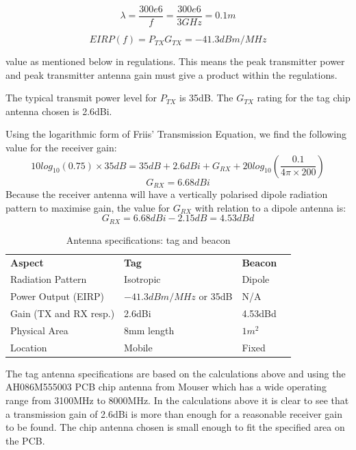 $$\lambda = \frac{300e6}{f} = \frac{300e6}{3GHz} = 0.1m$$

$$EIRP(f) = P_{TX}G_{TX} = -41.3dBm/MHz$$
\begin{center}
value as mentioned below in regulations. This means the peak transmitter power and peak transmitter antenna gain must give a product within the regulations.
\end{center}

The typical transmit power level for $P_{TX}$ is 35dB.\cite{DW-data} The $G_{TX}$ rating for the tag chip antenna chosen is 2.6dBi.

Using the logarithmic form of Friis' Transmission Equation, we find the following value for the receiver gain: 
$$10log_{10}(0.75) \times 35dB = 35dB + 2.6dBi + G_{RX} + 20log_{10}(\frac{0.1}{4 \pi \times 200})$$
$$G_{RX} = 6.68dBi$$
Because the receiver antenna will have a vertically polarised dipole radiation pattern to maximise  gain, the value for $G_{RX}$ with relation to a dipole antenna is:\cite{Book-Antenna} 
$$G_{RX} = 6.68dBi - 2.15dB = 4.53dBd$$

\begin{table}[H]
\centering
\caption{Antenna specifications: tag and beacon}
\label{antenna-specs}
\begin{tabular}{l l l l}
\textbf{Aspect}                      & \textbf{Tag} & \textbf{Beacon} \\ 
Radiation Pattern    	& Isotropic             & Dipole              \\
Power Output (EIRP)		& $-41.3dBm/MHz$ or 35dB        & N/A \\
Gain (TX and RX resp.)                	& 2.6dBi                     & 4.53dBd                    \\
Physical Area 			& 8mm length					 & $1m^2$          \\         
Location 				& Mobile                & Fixed                    \\         
\end{tabular}
\end{table}

The tag antenna specifications are based on the calculations above and using the AH086M555003 PCB chip antenna from Mouser which has a wide operating range from 3100MHz to 8000MHz. In the calculations above it is clear to see that a transmission gain of 2.6dBi is more than enough for a reasonable receiver gain to be found. The chip antenna chosen is small enough to fit the specified area on the PCB.

